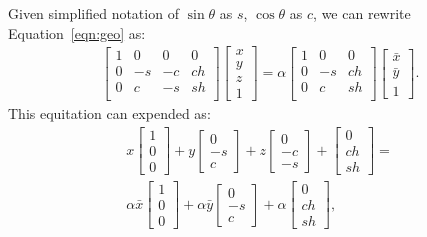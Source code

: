 \documentclass[10pt,twocolumn,letterpaper]{article}
\begin{document}
\noindent Given simplified notation of $\sin{\theta}$ as $s$,  $\cos{\theta}$ as $c$, we can rewrite Equation~\ref{eqn:geo} as:
{\small
\begin{gather}
    \begin{bmatrix}
        1 &  0 &  0 & 0\\
        0 & -s & -c & ch\\
        0 &  c & -s & sh\\
    \end{bmatrix}
    \begin{bmatrix}
         x \\ y \\ z \\ 1
    \end{bmatrix}
    =
    \alpha 
    \begin{bmatrix}
        1 &  0 &  0\\
        0 & -s & ch\\
        0 &  c & sh\\
    \end{bmatrix}
    \begin{bmatrix}
       \bar{x} \\ \bar{y} \\ 1
    \end{bmatrix}.  \nonumber
\end{gather}
}
\noindent This equitation can expended as:
{\small
\begin{gather}
    x
    \begin{bmatrix}
    1 \\ 0 \\ 0
    \end{bmatrix} + y
    \begin{bmatrix}
    0 \\ -s \\ c
    \end{bmatrix} + z
    \begin{bmatrix}
    0 \\ -c \\ -s
    \end{bmatrix} + 
    \begin{bmatrix}
    0 \\ ch \\ sh
    \end{bmatrix} = \nonumber\\
    \alpha \bar{x}
    \begin{bmatrix}
    1 \\ 0 \\ 0
    \end{bmatrix} + \alpha \bar{y}
    \begin{bmatrix}
    0 \\ -s \\ c
    \end{bmatrix} + \alpha
    \begin{bmatrix}
    0 \\ ch \\ sh
    \end{bmatrix}, \nonumber
\end{gather}
}
\end{document}
